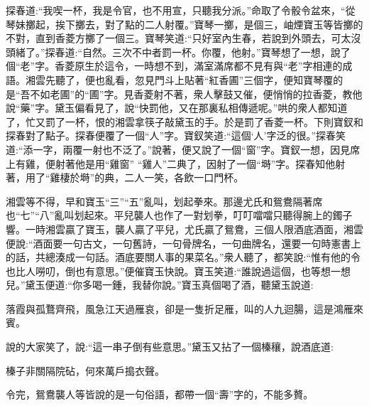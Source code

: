 \begin{parag}
    探春道:“我喫一杯，我是令官，也不用宣，只聽我分派。”命取了令骰令盆來，“從琴妹擲起，挨下擲去，對了點的二人射覆。”寶琴一擲，是個三，岫煙寶玉等皆擲的不對，直到香菱方擲了一個三。寶琴笑道:“只好室內生春，若說到外頭去，可太沒頭緒了。”探春道:“自然。三次不中者罰一杯。你覆，他射。”寶琴想了一想，說了個“老”字。香菱原生於這令，一時想不到，滿室滿席都不見有與“老”字相連的成語。湘雲先聽了，便也亂看，忽見門斗上貼著“紅香圃”三個字，便知寶琴覆的是“吾不如老圃”的“圃”字。見香菱射不著，衆人擊鼓又催，便悄悄的拉香菱，教他說“藥”字。黛玉偏看見了，說“快罰他，又在那裏私相傳遞呢。”哄的衆人都知道了，忙又罰了一杯，恨的湘雲拿筷子敲黛玉的手。於是罰了香菱一杯。下則寶釵和探春對了點子。探春便覆了一個“人”字。寶釵笑道:“這個‘人’字泛的很。”探春笑道:“添一字，兩覆一射也不泛了。”說著，便又說了一個“窗”字。寶釵一想，因見席上有雞，便射著他是用“雞窗” “雞人”二典了，因射了一個“塒”字。探春知他射著，用了“雞棲於塒”的典，二人一笑，各飲一口門杯。
\end{parag}


\begin{parag}
    湘雲等不得，早和寶玉“三”“五”亂叫，划起拳來。那邊尤氏和鴛鴦隔著席也“七”“八”亂叫划起來。平兒襲人也作了一對划拳，叮叮噹噹只聽得腕上的鐲子響。一時湘雲贏了寶玉，襲人贏了平兒，尤氏贏了鴛鴦，三個人限酒底酒面，湘雲便說:“酒面要一句古文，一句舊詩，一句骨牌名，一句曲牌名，還要一句時憲書上的話，共總湊成一句話。酒底要關人事的果菜名。”衆人聽了，都笑說:“惟有他的令也比人嘮叨，倒也有意思。”便催寶玉快說。寶玉笑道:“誰說過這個，也等想一想兒。”黛玉便道:“你多喝一鍾，我替你說。”寶玉真個喝了酒，聽黛玉說道:
\end{parag}


\begin{poem}
    \begin{pl}落霞與孤鶩齊飛，風急江天過雁哀，卻是一隻折足雁，叫的人九迴腸，這是鴻雁來賓。\end{pl}
\end{poem}


\begin{parag}
    說的大家笑了，說:“這一串子倒有些意思。”黛玉又拈了一個榛穰，說酒底道:
\end{parag}


\begin{poem}
    \begin{pl}榛子非關隔院砧，何來萬戶搗衣聲。\end{pl}
\end{poem}


\begin{parag}
    令完，鴛鴦襲人等皆說的是一句俗語，都帶一個“壽”字的，不能多贅。
\end{parag}


